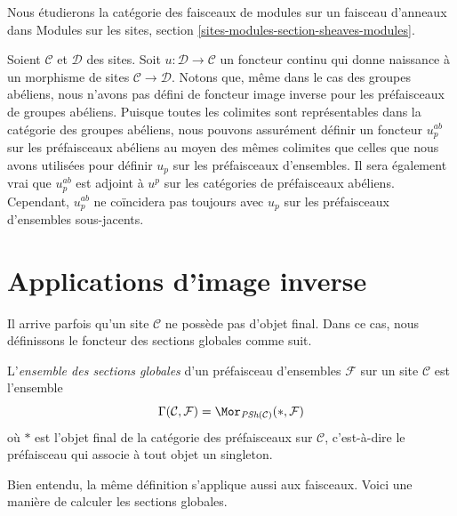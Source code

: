 \noindent
Nous étudierons la catégorie des faisceaux de modules sur un faisceau d'anneaux dans
Modules sur les sites, section \ref{sites-modules-section-sheaves-modules}.

\begin{remark}
\label{remark-no-pullback-presheaves}
Soient $\mathcal{C}$ et $\mathcal{D}$ des sites.
Soit $u : \mathcal{D} \to \mathcal{C}$ un foncteur continu
qui donne naissance à un morphisme de sites $\mathcal{C} \to \mathcal{D}$.
Notons que, même dans le cas des groupes abéliens, nous n'avons pas défini
de foncteur image inverse pour les préfaisceaux de groupes abéliens.
Puisque toutes les colimites sont représentables dans
la catégorie des groupes abéliens, nous pouvons assurément définir
un foncteur $u_p^{ab}$ sur les préfaisceaux abéliens au moyen des mêmes colimites
que celles que nous avons utilisées pour définir $u_p$ sur les préfaisceaux d'ensembles.
Il sera également vrai que $u_p^{ab}$ est adjoint à
$u^p$ sur les catégories de préfaisceaux abéliens.
Cependant, $u_p^{ab}$ ne coïncidera pas toujours avec
$u_p$ sur les préfaisceaux d'ensembles sous-jacents.
\end{remark}












\section{Applications d'image inverse}
\label{section-pullback}

\noindent
Il arrive parfois qu'un site $\mathcal{C}$ ne possède
pas d'objet final. Dans ce cas, nous définissons le
foncteur des sections globales comme suit.

\begin{definition}
\label{definition-global-sections}
L'{\it ensemble des sections globales} d'un préfaisceau d'ensembles $\mathcal{F}$ sur un
site $\mathcal{C}$ est l'ensemble
$$
\Gamma(\mathcal{C}, \mathcal{F}) =
\Mor_{\textit{PSh}(\mathcal{C})}(*, \mathcal{F})
$$
où $*$ est l'objet final de la catégorie des préfaisceaux sur
$\mathcal{C}$, c'est-à-dire le préfaisceau qui associe à tout objet
un singleton.
\end{definition}

\noindent
Bien entendu, la même définition s'applique aussi aux faisceaux.
Voici une manière de calculer les sections globales.

